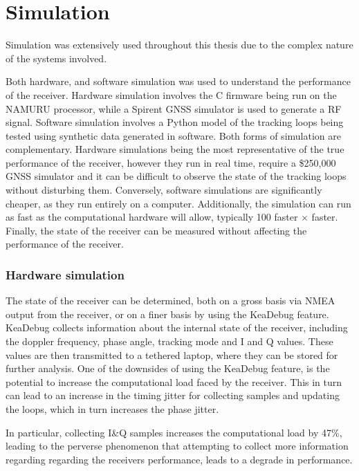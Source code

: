 \chapter{Simulation}\label{ch:Simulation}

Simulation was extensively used throughout this thesis due to the complex nature of the systems involved. 

Both hardware, and software simulation was used to understand the performance of the receiver. Hardware simulation involves the C firmware being run on the \ac{NAMURU} processor, while a Spirent GNSS simulator is used to generate a RF signal. Software simulation involves a Python model of the tracking loops being tested using synthetic data generated in software. Both forms of simulation are complementary. Hardware simulations being the most representative of the true performance of the receiver, however they run in real time, require a \$250,000 GNSS simulator and it can be difficult to observe the state of the tracking loops without disturbing them. Conversely, software simulations are significantly cheaper, as they run entirely on a computer. Additionally, the simulation can run as fast as the computational hardware will allow, typically 100 faster $\times$ faster. Finally, the state of the receiver can be measured without affecting the performance of the receiver.

\subsection{Hardware simulation}
The state of the receiver can be determined, both on a gross basis via NMEA output from the receiver, or on a finer basis by using the KeaDebug feature. KeaDebug collects information about the internal state of the receiver, including the doppler frequency, phase angle, tracking mode and I and Q values. These values are then transmitted to a tethered laptop, where they can be stored for further analysis. One of the downsides of using the KeaDebug feature, is the potential to increase the computational load faced by the receiver. This in turn can lead to an increase in the timing jitter for collecting samples and updating the loops, which in turn increases the phase jitter. 

In particular, collecting I\&Q samples increases the computational load by 47\%, leading to the perverse phenomenon that attempting to collect more information regarding regarding the receivers performance, leads to a degrade in performance.

